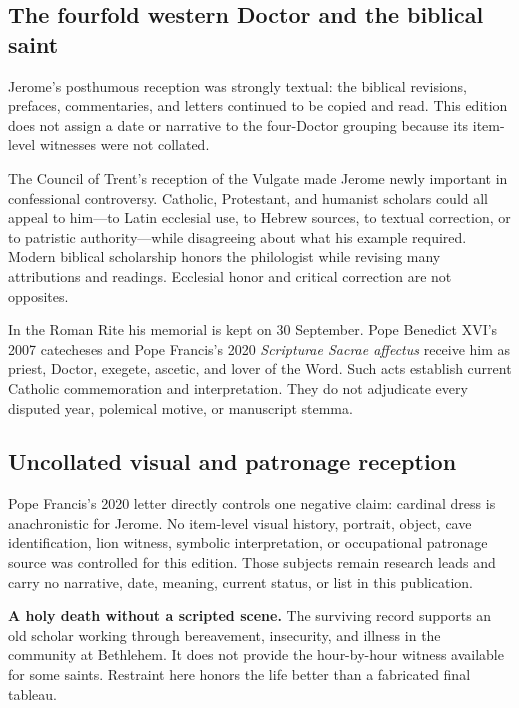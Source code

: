 \subsection{The fourfold western Doctor and the biblical saint}

Jerome's posthumous reception was strongly textual: the biblical revisions,
prefaces, commentaries, and letters continued to be copied and read. This
edition does not assign a date or narrative to the four-Doctor grouping because
its item-level witnesses were not collated.

The Council of Trent's reception of the Vulgate made Jerome newly important in
confessional controversy. Catholic, Protestant, and humanist scholars could
all appeal to him---to Latin ecclesial use, to Hebrew sources, to textual
correction, or to patristic authority---while disagreeing about what his
example required. Modern biblical scholarship honors the philologist while
revising many attributions and readings. Ecclesial honor and critical
correction are not opposites.

In the Roman Rite his memorial is kept on 30 September. Pope Benedict XVI's
2007 catecheses and Pope Francis's 2020 \emph{Scripturae Sacrae affectus}
receive him as priest, Doctor, exegete, ascetic, and lover of the Word. Such
acts establish current Catholic commemoration and interpretation. They do not
adjudicate every disputed year, polemical motive, or manuscript stemma.

\subsection{Uncollated visual and patronage reception}

Pope Francis's 2020 letter directly controls one negative claim: cardinal dress
is anachronistic for Jerome. No item-level visual history, portrait, object,
cave identification, lion witness, symbolic interpretation, or occupational
patronage source was controlled for this edition. Those subjects remain
research leads and carry no narrative, date, meaning, current status, or list
in this publication.

\begin{studyframe}
\textbf{A holy death without a scripted scene.} The surviving record supports
an old scholar working through bereavement, insecurity, and illness in the
community at Bethlehem. It does not provide the hour-by-hour witness available
for some saints. Restraint here honors the life better than a fabricated final
tableau.
\end{studyframe}
